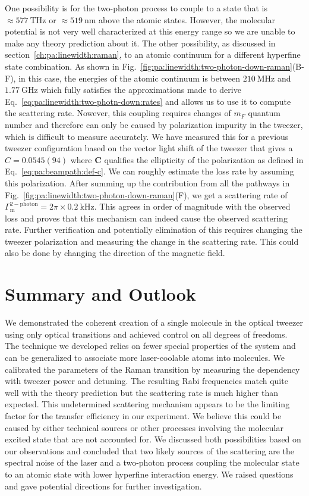 One possibility is for the two-photon process to couple to a state
that is $\approx\!577~\mathrm{THz}$ or $\approx\!519~\mathrm{nm}$ above the atomic states.
However, the molecular potential is not very well characterized at this energy range
so we are unable to make any theory prediction about it.
The other possibility, as discussed in section~\ref{ch:pa:linewidth:raman},
to an atomic continuum for a different hyperfine state combination.
As shown in Fig.~\ref{fig:pa:linewidth:two-photon-down-raman}(B-F),
in this case, the energies of the atomic continuum is between $210~\mathrm{MHz}$
and $1.77~\mathrm{GHz}$ which fully satisfies the approximations
made to derive Eq.~\ref{eq:pa:linewidth:two-photn-down:rates}
and allows us to use it to compute the scattering rate.
Nowever, this coupling requires changes of $m_F$ quantum number
and therefore can only be caused by polarization impurity in the tweezer,
which is difficult to measure accurately.
We have measured this for a previous tweezer configuration
based on the vector light shift of the tweezer that gives a $C=0.0545(94)$
where $\mathbf{C}$ qualifies the ellipticity of the polarization
as defined in Eq.~\ref{eq:pa:beampath:def-c}.
We can roughly estimate the loss rate by assuming this polarization.
After summing up the contribution from all the pathways in
Fig.~\ref{fig:pa:linewidth:two-photon-down-raman}(F),
we get a scattering rate of $\Gamma_{\mathrm{m}}^{\mathrm{2-photon}}=2\pi\times0.2~\mathrm{kHz}$.
This agrees in order of magnitude with the observed loss and
proves that this mechanism can indeed cause the observed scattering rate.
Further verification and potentially elimination of this requires
changing the tweezer polarization and measuring the change in the scattering rate.
This could also be done by changing the direction of the magnetic field.

\section{Summary and Outlook}
\label{ch:raman-transfer:summary}

We demonstrated the coherent creation of a single molecule in the optical tweezer
using only optical transitions and achieved control on all degrees of freedoms.
The technique we developed relies on fewer special properties of the system
and can be generalized to associate more laser-coolable atoms into molecules.
We calibrated the parameters of the Raman transition by measuring the dependency
with tweezer power and detuning.
The resulting Rabi frequencies match quite well with the theory prediction
but the scattering rate is much higher than expected.
This undetermined scattering mechanism appears to be the limiting factor
for the transfer efficiency in our experiment.
We believe this could be caused by either technical sources
or other processes involving the molecular excited state that are not accounted for.
We discussed both possibilities based on our observations
and concluded that two likely sources of the scattering are the spectral noise of the laser
and a two-photon process coupling the molecular state to an atomic state
with lower hyperfine interaction energy.
We raised questions and gave potential directions for further investigation.

